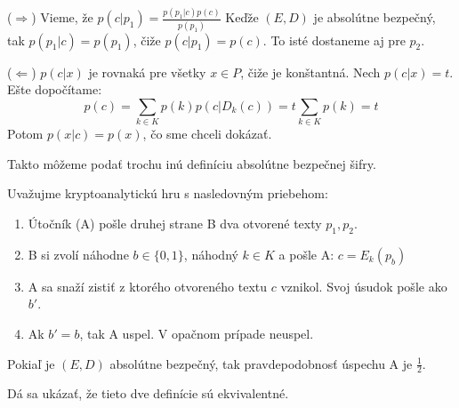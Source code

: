 \begin{dokaz}
($\Rightarrow$) Vieme, že $p(c|p_1) = \frac{p(p_1|c) p(c)}{p(p_1)}$ Keďže $(E,D)$ je absolútne
bezpečný, tak $p(p_1|c) = p(p_1)$, čiže $p(c|p_1) = p(c)$. To isté dostaneme aj pre $p_2$.

($\Leftarrow$) $p(c|x)$ je rovnaká pre všetky $x \in P$, čiže je konštantná. Nech $p(c|x) = t$.
Ešte dopočítame:
$$p(c) = \displaystyle\sum_{k \in K} p(k) p(c|D_k(c)) = t \displaystyle\sum_{k \in K} p(k) = t$$
Potom $p(x|c) = p(x)$, čo sme chceli dokázať.
\end{dokaz}

Takto môžeme podať trochu inú definíciu absolútne bezpečnej šifry.

\begin{definicia}
Uvažujme kryptoanalytickú hru s nasledovným priebehom:
\begin{enumerate}
\item Útočník (A) pošle druhej strane B dva otvorené texty $p_1, p_2$.
\item B si zvolí náhodne $b \in \{0,1\}$, náhodný $k \in K$ a pošle A: $c = E_k(p_b)$
\item A sa snaží zistiť z ktorého otvoreného textu $c$ vznikol. Svoj úsudok pošle ako $b'$.
\item Ak $b' = b$, tak A uspel. V opačnom prípade neuspel.
\end{enumerate}
Pokiaľ je $(E,D)$ absolútne bezpečný, tak pravdepodobnosť úspechu A je $\frac{1}{2}$.
\end{definicia}

Dá sa ukázať, že tieto dve definície sú ekvivalentné.
